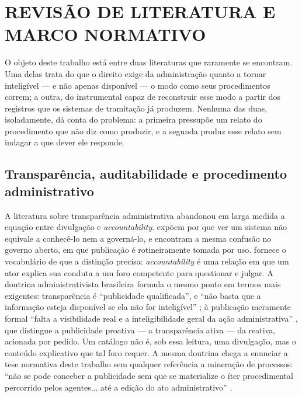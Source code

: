 \section{REVISÃO DE LITERATURA E MARCO NORMATIVO}
\label{sec:revisao}

O objeto deste trabalho está entre duas literaturas que raramente se encontram. Uma delas trata do
que o direito exige da administração quanto a tornar inteligível --- e não apenas disponível --- o
modo como seus procedimentos correm; a outra, do instrumental capaz de reconstruir esse modo a
partir dos registros que os sistemas de tramitação já produzem. Nenhuma das duas, isoladamente, dá
conta do problema: a primeira pressupõe um relato do procedimento que não diz como produzir, e a
segunda produz esse relato sem indagar a que dever ele responde.

\subsection{Transparência, auditabilidade e procedimento administrativo}
\label{sec:rev-transparencia}

A literatura sobre transparência administrativa abandonou em larga medida a equação entre
divulgação e \emph{accountability}.  expõem por que ver um sistema não
equivale a conhecê-lo nem a governá-lo, e  encontram a mesma
confusão no governo aberto, em que publicação é rotineiramente tomada por uso.
 fornece o vocabulário de que a distinção precisa:
\emph{accountability} é uma relação em que um ator explica sua conduta a um foro competente para
questionar e julgar. A doutrina administrativista brasileira formula o mesmo ponto em termos mais
exigentes: transparência é ``publicidade qualificada'', e ``não basta que a informação esteja
disponível se ela não for inteligível'' \cite[p.~245]{brbaptista2023transparencia}; à publicação
meramente formal ``falta a visibilidade real e a inteligibilidade geral da ação administrativa''
\cite[p.~107--108]{brrodrigues2014publicidade}, que distingue a publicidade proativa --- a
transparência ativa --- da reativa, acionada por pedido. Um catálogo não é, sob essa leitura, uma
divulgação, mas o conteúdo explicativo que tal foro requer. A mesma doutrina chega a enunciar a tese
normativa deste trabalho sem qualquer referência a mineração de processos: ``não se pode conceber a
publicidade sem que se materialize o íter procedimental percorrido pelos agentes... até a edição do
ato administrativo'' \cite[p.~255--256]{brbaptista2023transparencia}.

